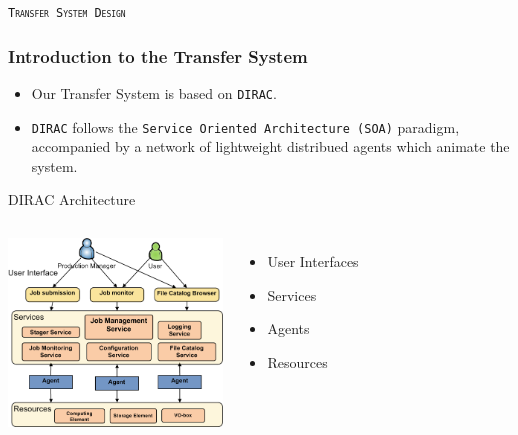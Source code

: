 \begin{frame}
    \begin{center}
        \LARGE \tt{{\textsc{Transfer System Design}}}
    \end{center}
\end{frame}

\begin{frame}
    \frametitle{Introduction to the Transfer System}
    \begin{itemize}
        \item Our Transfer System is based on {\tt DIRAC}. %
        \item {\tt DIRAC} follows the {\tt Service Oriented Architecture (SOA)}
                paradigm, accompanied by a network of lightweight distribued
                agents which animate the system.
    \end{itemize}
    \begin{block}{DIRAC Architecture}
        \begin{columns}
                \includegraphics[height=5cm,keepaspectratio]{data/DIRAC_Architecture.png}
                \begin{itemize}
                    \item User Interfaces
                    \item Services
                    \item Agents
                    \item Resources
                \end{itemize}
        \end{columns}
    \end{block}
\end{frame}

